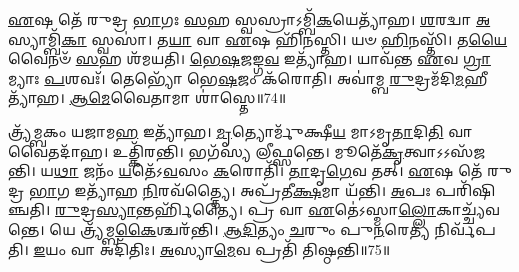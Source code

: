 \-\ul{𑌏}\-𑌷 𑌤𑍇᳴ 𑌰𑍁𑌦𑍍𑌰 \ul{𑌭𑌾}\-𑌗𑌃 \ul{𑌸}\-𑌹 𑌸𑍍𑌵𑌸𑍍𑌰𑌾\-𑌽𑌮𑍍𑌬𑌿᳴\-\ul{𑌕}\-𑌯𑍇𑌤𑍍𑌯𑌾᳴𑌹।
\-\ul{𑌶}\-𑌰𑌦𑍍𑌵𑌾 \ul{𑌅}\-𑌸𑍍𑌯𑌾𑌮𑍍𑌬𑌿᳴\-\ul{𑌕𑌾} 𑌸𑍍𑌵𑌸𑌾॑।
𑌤\-\ul{𑌯𑌾} 𑌵𑌾 \ul{𑌏}\-𑌷 𑌹𑌿᳴𑌨𑌸𑍍𑌤𑌿।
𑌯𑍞 \ul{𑌹𑌿}\-𑌨𑌸𑍍𑌤𑌿᳴।
𑌤\-\ul{𑌯𑍈}\-𑌵𑍈𑌨𑍞᳴ \ul{𑌸}\-𑌹 𑌶᳴𑌮𑌯𑌤𑌿।
\-\ul{𑌭𑍇}\-\-\ul{𑌷}\-𑌜𑌙𑍍𑌗\-\ul{𑌵} 𑌇𑌤𑍍𑌯𑌾᳴𑌹।
𑌯𑌾𑌵᳴𑌨𑍍𑌤 \ul{𑌏}\-𑌵 \ul{𑌗𑍍𑌰𑌾}\-𑌮𑍍𑌯𑌾𑌃 \ul{𑌪}\-𑌶𑌵𑌃᳴।
𑌤𑍇𑌭𑍍𑌯𑍋᳴ 𑌭𑍇\-\ul{𑌷}\-𑌜𑌂 𑌕᳴𑌰𑍋𑌤𑌿।
𑌅𑌵𑌾॑𑌮𑍍𑌬 \ul{𑌰𑍁}\-𑌦𑍍𑌰𑌮᳴𑌦𑌿\-\ul{𑌮}\-𑌹𑍀𑌤𑍍𑌯𑌾᳴𑌹।
\-\ul{𑌆}\-\-\-\ul{𑌮𑍇}\-𑌵𑍈𑌤𑌾𑌮𑌾 𑌶𑌾॑𑌸𑍍𑌤𑍇॥74॥

𑌤𑍍𑌰𑍍𑌯᳴𑌮𑍍𑌬𑌕𑌂 𑌯𑌜𑌾𑌮\-\ul{𑌹} 𑌇𑌤𑍍𑌯𑌾᳴𑌹।
\-\ul{𑌮𑍃}\-𑌤𑍍𑌯𑍋𑌰𑍍𑌮𑍁᳴𑌕𑍍𑌷𑍀\-\ul{𑌯} 𑌮𑌾𑌽𑌮𑍃\-\ul{𑌤𑌾}\-𑌦𑌿\-\ul{𑌤𑌿} 𑌵𑌾𑌵𑍈𑌤𑌦𑌾᳴𑌹।
𑌉𑌤𑍍𑌕𑌿᳴𑌰𑌨𑍍𑌤𑌿।
𑌭𑌗᳴𑌸𑍍𑌯 𑌲𑍀𑌫𑍍𑌸𑌨𑍍𑌤𑍇।
𑌮𑍂𑌤𑍇᳴\-\ul{𑌕𑍃}\-𑌤𑍍𑌵𑌾\-𑌽𑌽𑌸᳴𑌜𑌨𑍍𑌤𑌿।
𑌯\-\ul{𑌥𑌾} 𑌜𑌨𑌂᳴ \ul{𑌯}\-𑌤𑍇᳴\-𑌽\-\ul{𑌵}\-𑌸𑌂 \ul{𑌕}\-𑌰𑍋𑌤𑌿᳴।
\-\ul{𑌤𑌾}\-𑌦𑍃\-\ul{𑌗𑍇}\-𑌵 𑌤𑌤𑍍।
\-\ul{𑌏}\-𑌷 𑌤𑍇᳴ 𑌰𑍁𑌦𑍍𑌰 \ul{𑌭𑌾}\-𑌗 𑌇𑌤𑍍𑌯𑌾᳴𑌹 \ul{𑌨𑌿}\-𑌰𑌵᳴𑌤𑍍𑌤𑍍𑌯𑍈।
𑌅𑌪𑍍𑌰᳴𑌤𑍀\-\ul{𑌕𑍍𑌷}\-𑌮𑌾 𑌯᳴𑌨𑍍𑌤𑌿।
\-\ul{𑌅}\-𑌪𑌃 𑌪𑌰𑌿᳴𑌷𑌿𑌞𑍍𑌚𑌤𑌿।
\-\ul{𑌰𑍁}\-𑌦𑍍𑌰\-\ul{𑌸𑍍𑌯𑌾}\-𑌨𑍍𑌤𑌰𑍍\mbox{}𑌹𑌿᳴𑌤𑍍𑌯𑍈।
𑌪𑍍𑌰 𑌵𑌾 \ul{𑌏}\-𑌤𑍇॑\-𑌽𑌸𑍍𑌮𑌾\-\ul{𑌲𑍍𑌲𑍋}\-𑌕𑌾𑌚𑍍𑌚𑍍𑌯᳴𑌵𑌨𑍍𑌤𑍇।
𑌯𑍇 𑌤𑍍𑌰𑍍𑌯᳴𑌮𑍍𑌬\-\ul{𑌕𑍈}\-𑌶𑍍𑌚𑌰᳴𑌨𑍍𑌤𑌿।
\-\ul{𑌆}\-\-\ul{𑌦𑌿}\-𑌤𑍍𑌯𑌂 \ul{𑌚}\-𑌰𑍁𑌂 𑌪𑍁\-\ul{𑌨}\-𑌰𑍇\-\ul{𑌤𑍍𑌯} 𑌨𑌿𑌰𑍍𑌵᳴𑌪𑌤𑌿।
\-\ul{𑌇}\-𑌯𑌂 𑌵𑌾 𑌅𑌦𑌿᳴𑌤𑌿𑌃।
\-\ul{𑌅}\-𑌸𑍍𑌯𑌾\-\ul{𑌮𑍇}\-𑌵 𑌪𑍍𑌰𑌤𑌿᳴ 𑌤𑌿𑌷𑍍𑌠𑌨𑍍𑌤𑌿॥75॥\anuvakamend[\-\ul{𑌯}\-\-\ul{𑌨𑍍𑌤𑌿} \ul{𑌬𑍍𑌰𑍂}\-\-\ul{𑌯𑌾}\-\-\ul{𑌨𑍍𑌨𑌿}\-𑌰𑌵᳴𑌦𑌯𑌤𑍇 𑌶𑌾𑌸𑍍𑌤𑍇 𑌸𑌿𑌞𑍍𑌚\-\ul{𑌤𑌿} 𑌷𑌟𑍍𑌚᳴]




